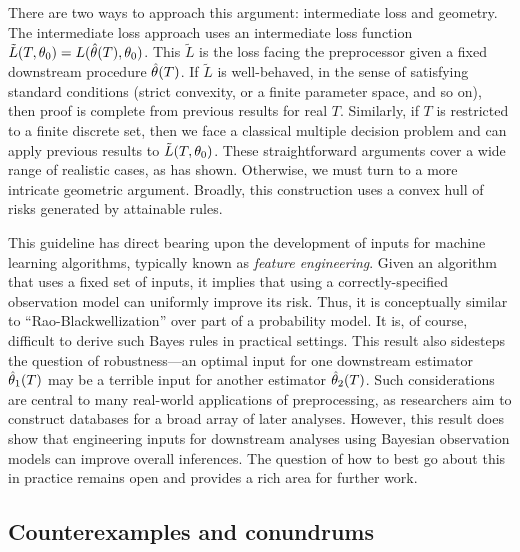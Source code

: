 There are two ways to approach this argument: intermediate loss and geometry.
The intermediate loss approach uses an intermediate loss function $\tilde{L}(T, \theta_0) = L(\hat{\theta}(T), \theta_0)$.
This $\tilde{L}$ is the loss facing the preprocessor given a fixed downstream procedure $\hat{\theta}(T)$.
If $\tilde{L}$ is well-behaved, in the sense of satisfying standard conditions (strict convexity, or a finite parameter space, and so on), then proof is complete from previous results for real $T$.
Similarly, if $T$ is restricted to a finite discrete set, then we face a classical multiple decision problem and can apply previous results to $\tilde{L}(T, \theta_0)$.
These straightforward arguments cover a wide range of realistic cases, as \cite{Berger1985} has shown.
Otherwise, we must turn to a more intricate geometric argument.
Broadly, this construction uses a convex hull of risks generated by attainable rules.

This guideline has direct bearing upon the development of inputs for machine learning algorithms, typically known as \emph{feature engineering}.
Given an algorithm that uses a fixed set of inputs, it implies that using a correctly-specified observation model can uniformly improve its risk.
Thus, it is conceptually similar to ``Rao-Blackwellization'' over part of a probability model.
It is, of course, difficult to derive such Bayes rules in practical settings.
This result also sidesteps the question of robustness---an optimal input for one downstream estimator $\hat{\theta}_1(T)$ may be a terrible input for another estimator $\hat{\theta}_2(T)$.
Such considerations are central to many real-world applications of preprocessing, as researchers aim to construct databases for a broad array of later analyses.
However, this result does show that engineering inputs for downstream analyses using Bayesian observation models can improve overall inferences.
The question of how to best go about this in practice remains open and provides a rich area for further work.

\subsection{Counterexamples and conundrums}
\label{multiphase:sec:counterexamples}

